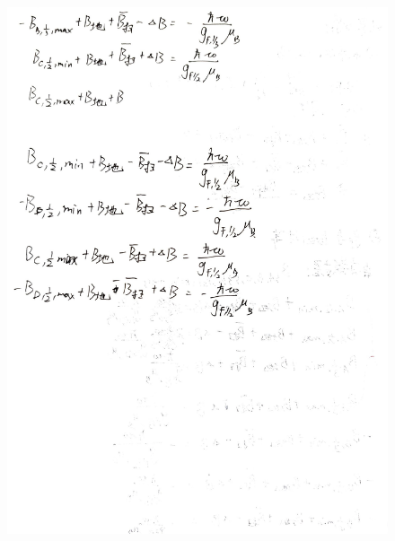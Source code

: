 \documentclass[10pt,hyperref,a4paper,UTF8]{ctexart}
\begin{document}
\begin{figure}[thbp!]
        \begin{minipage}[t]{0.49\linewidth}
                \centering
                \includegraphics[width=\linewidth]{figures/appedix3.jpg}
        \end{minipage}
        \begin{minipage}[t]{0.49\linewidth}
                \centering

\end{minipage}
\end{figure}
\end{document}
